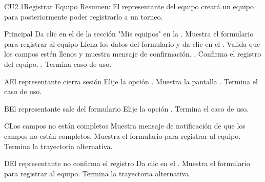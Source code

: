 
	\begin{UseCase}{CU2.1}{Registrar Equipo}{
		Resumen: El representante del equipo creará un equipo para posteriormente poder registrarlo a un torneo. }
	\end{UseCase}
	\newpage
	\begin{UCtrayectoria}{Principal}
	\UCpaso[\UCactor] Da clic en el de la sección "Mis equipos" en la  .	
	\UCpaso Muestra el formulario para registrar al equipo
	\UCpaso[\UCactor] Llena los datos del formulario y da clic en el   .
	\UCpaso Valida que los campos estén llenos y muestra mensaje de confirmación. . 
	\UCpaso[\UCactor] Confirma el registro del equipo.  .
	Termina caso de uso.
\end{UCtrayectoria}

	\begin{UCtrayectoriaA}{A}{El representante cierra sesión}
		\UCpaso[\UCactor] Elije la opción .
		\UCpaso Muestra la pantalla .
		\UCpaso Termina el caso de uso.
	\end{UCtrayectoriaA}

	\begin{UCtrayectoriaA}{B}{El representante sale del formulario}
		\UCpaso[\UCactor] Elije la opción .
		\UCpaso Termina el caso de uso.
	\end{UCtrayectoriaA}
	
	\begin{UCtrayectoriaA}{C}{Los campos no están completos}
		\UCpaso Muestra mensaje de notificación de que los campos no están completos.
		\UCpaso Muestra el formulario para registrar al equipo.
		\UCpaso Termina la trayectoria alternativa.
	\end{UCtrayectoriaA}
	
	\begin{UCtrayectoriaA}{D}{El representante no confirma el registro}
		\UCpaso[\UCactor] Da clic en el .
		\UCpaso Muestra el formulario para registrar al equipo.
		\UCpaso Termina la trayectoria alternativa.
	\end{UCtrayectoriaA}
